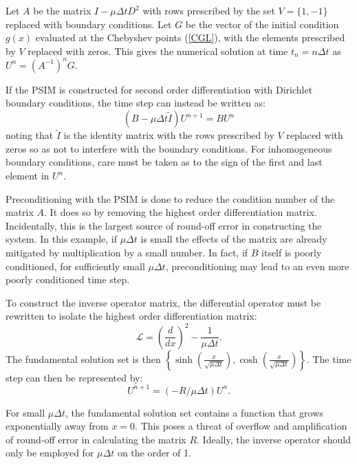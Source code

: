 \documentclass{sfuthesis}
\begin{document}
Let $A$ be the matrix $I - \mu \Delta t D^2$ with rows prescribed by the set $V = \{ 1, -1 \}$ replaced with boundary conditions.
Let $G$ be the vector of the initial condition $g(x)$ evaluated at the Chebyshev points (\ref{CGL}), with the elements prescribed by $V$ replaced with zeros.
This gives the numerical solution at time $t_n = n \Delta t$ as $U^n = (A^{-1})^n G$.

If the PSIM is constructed for second order differentiation with Dirichlet boundary conditions, the time step can instead be written as:
\begin{equation}
(B - \mu \Delta t \tilde{I}) U^{n+1} = B U^n
\end{equation}
noting that $\tilde{I}$ is the identity matrix with the rows prescribed by $V$ replaced with zeros so as not to interfere with the boundary conditions.
For inhomogeneous boundary conditions, care must be taken as to the sign of the first and last element in $U^n$.

Preconditioning with the PSIM is done to reduce the condition number of the matrix $A$.
It does so by removing the highest order differentiation matrix.
Incidentally, this is the largest source of round-off error in constructing the system.
In this example, if $\mu \Delta t$ is small the effects of the matrix are already mitigated by multiplication by a small number.
In fact, if $B$ itself is poorly conditioned, for sufficiently small $\mu \Delta t$, preconditioning may lead to an even more poorly conditioned time step.

To construct the inverse operator matrix, the differential operator must be rewritten to isolate the highest order differentiation matrix:
\begin{equation}
\mathcal{L} = \left ( \frac{d}{dx} \right )^2 - \frac{1}{\mu \Delta t}.
\end{equation}
The fundamental solution set is then $\left \{ \sinh \left ( \frac{x}{\sqrt{\mu \Delta t}} \right ), \cosh \left ( \frac{x}{\sqrt{\mu \Delta t}} \right ) \right \}$.
The time step can then be represented by:
\begin{equation}
U^{n+1} = (-R / \mu \Delta t) U^n .
\end{equation}

For small $\mu \Delta t$, the fundamental solution set contains a function that grows exponentially away from $x=0$.
This poses a threat of overflow and amplification of round-off error in calculating the matrix $R$.
Ideally, the inverse operator should only be employed for $\mu \Delta t$ on the order of 1.
\end{document}
